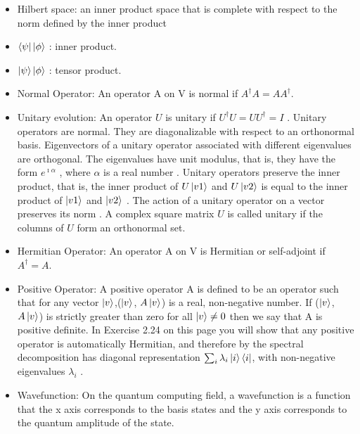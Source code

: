 \documentclass{article}
\begin{document}
    \begin{itemize}
        \item Hilbert space: an inner product space that is complete with respect to the norm defined by the inner product
        
        \item $\bra{\psi}\ket{\phi}$ : inner product.
        
        \item $\ket{\psi}\ket{\phi}$ : tensor product.
        
        \item Normal Operator: An operator A on V is normal if $A^\dag A = A A^\dag$.\cite{portugal}
        
        \item Unitary evolution: An operator $U$ is unitary if $U^\dag U =  UU^\dag = I$ . Unitary operators are normal. They are diagonalizable with respect to an orthonormal basis. Eigenvectors of a unitary operator associated with different eigenvalues are orthogonal. The eigenvalues have unit modulus, that is, they have the form $e^{\imath\alpha}$ , where $\alpha$ is a real number . Unitary operators preserve the inner product, that is, the inner product of $U\ket{v1}$ and $U\ket{v2}$ is equal to the inner product of $\ket{v1}$ and $\ket{v2}$ . The action of a unitary operator on a vector preserves its norm \cite{portugal} . A complex square matrix $U$ is called unitary if the columns of $U$ form an orthonormal set.
        
        \item Hermitian Operator: An operator A on V is Hermitian or self-adjoint if $A^\dag = A$.\cite{portugal}

        \item Positive Operator: A positive operator A is deﬁned to be an operator such that for any vector $\ket{v}$,($\ket{v}$, $A\ket{v}$) is a real, non-negative number. If ($\ket{v}$, $A\ket{v}$) is strictly greater than zero for all $\ket{v} \neq 0$ then we say that A is positive deﬁnite. In Exercise 2.24 on this page you will show that any positive operator is automatically Hermitian, and therefore by the spectral decomposition has diagonal representation $\sum_i \lambda_i \ket{i}\bra{i}$, with non-negative eigenvalues $\lambda_i$ . \cite{quantccompquantinfo}
        
        \item Wavefunction: On the quantum computing field, a wavefunction is a function that the x axis corresponds to the basis states and the y axis corresponds to the quantum amplitude of the state.
        

\end{itemize}
\end{document}
